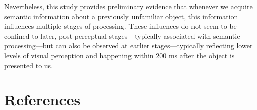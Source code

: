 \documentclass[
  english,
  doc,12pt,twoside,floatsintext]{apa7}
\newlength{\cslhangindent}
\begin{document}
Nevertheless, this study provides preliminary evidence that whenever we acquire semantic information about a previously unfamiliar object, this information influences multiple stages of processing. These influences do not seem to be confined to later, post-perceptual stages---typically associated with semantic processing---but can also be observed at earlier stages---typically reflecting lower levels of visual perception and happening within 200 ms after the object is presented to us.

\newpage

\hypertarget{references}{%
\section{References}\label{references}}

\setlength{\cslhangindent}{0.5in}

\raggedright
\setlength{\cslhangindent}{0.5in}
\end{document}
